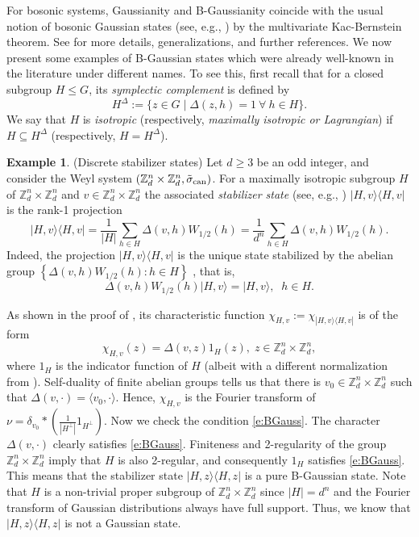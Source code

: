 \documentclass[12pt,reqno]{amsart}
\theoremstyle{definition}
\newtheorem{ex}[thm]{Example}
\theoremstyle{definition}
\theoremstyle{definition}
\numberwithin{thm}{section}
\numberwithin{equation}{section}
\newcommand{\set}[1]{\left\{#1\right\}}
\newcommand{\la}{\langle}
\newcommand{\ra}{\rangle}
\newcommand{\bZ}{\mathbb{Z}}
\begin{document}
For bosonic systems, Gaussianity and B-Gaussianity coincide with the usual notion of bosonic Gaussian states (see, e.g., \cite[\S 12.3.2]{Hol}) by the multivariate Kac-Bernstein theorem. See \cite{Feldman} for more details, generalizations, and further references. We now present some examples of B-Gaussian states which were already well-known in the literature under different names. To see this, first recall that for a closed subgroup $H\leq G$, its \textit{symplectic complement} is defined by
   $$H^{\Delta}:=\{z\in G\mid\Delta(z,h)=1 \ \forall \ h\in H \}.$$
We say that $H$ is \textit{isotropic} (respectively, \textit{maximally isotropic or Lagrangian}) if $H\subseteq H^{\Delta}$ (respectively, $H=H^\Delta$).


\begin{ex}\label{ex:stab} (Discrete stabilizer states) Let $d\ge 3$ be an odd integer, and consider the Weyl system $(\bZ_d^n\times\bZ_d^n, \tilde{\sigma}_{\rm can})$. For a maximally isotropic subgroup $H$ of $\bZ_d^n\times\bZ_d^n$ and $v\in\bZ_d^n\times\bZ_d^n$ the associated {\em stabilizer state} (see, e.g., \cite{Gro,HDD}) $|H,v\ra\la H,v|$ is the rank-1 projection
\begin{equation} \label{eq-stabilizerstate}
    |H,v\ra\la H,v|=\frac{1}{|H|}\sum_{h\in H}\Delta(v,h) W_{1/2}(h)=\frac{1}{d^n}\sum_{h\in H}\Delta(v,h) W_{1/2}(h).
\end{equation}
Indeed, the projection $|H,v\ra\la H,v|$ is the unique state stabilized by the abelian group $\set{\Delta(v,h)W_{1/2}(h):h\in H}$ \cite[Lemma 8]{Gro}, that is,  
    $$\Delta(v,h)W_{1/2}(h)|H,v\ra=|H,v\ra,\;\; h\in H.$$

As shown in the proof of \cite[Lemma 9]{Gro}, its characteristic function $\chi_{H,v} := \chi_{|H,v\ra\la H,v|}$ is of the form
    $$\chi_{H,v}(z)=\Delta(v,z)1_{H}(z), \; z\in \bZ_d^n\times\bZ_d^n,$$
where $1_{H}$ is the indicator function of $H$ (albeit with a different normalization from \cite{Gro}). Self-duality of finite abelian groups tells us that there is $v_0\in\bZ_d^n\times\bZ_d^n$ such that $\Delta(v,\cdot)=\la v_0,\cdot\ra$. Hence, $\chi_{H,v}$ is the Fourier transform of $\nu=\delta_{v_0}\ast (\frac{1}{|H^\perp|}1_{H^\perp})$. Now we check the condition \eqref{e:BGauss}. The character $\Delta(v,\cdot)$ clearly satisfies \eqref{e:BGauss}. Finiteness and 2-regularity of the group $\bZ_d^n\times\bZ_d^n$ imply that $H$ is also 2-regular, and consequently $1_H$ satisfies \eqref{e:BGauss}. This means that the stabilizer state $|H,z\ra\la H,z|$ is a pure B-Gaussian state. Note that $H$ is a non-trivial proper subgroup of $\bZ_d^n\times\bZ_d^n$  since $|H| = d^n$ and the Fourier transform of Gaussian distributions always have full support. Thus, we know that $|H,z\ra\la H,z|$ is not a Gaussian state.


\end{ex}
\end{document}
